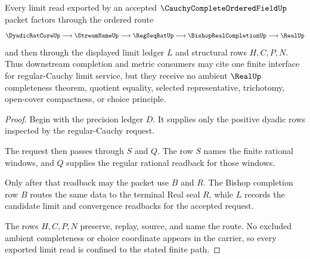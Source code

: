 \begin{theorem}
\label{thm:cauchy-complete-ordered-field-regular-cauchy-limit-route}
Every limit read exported by an accepted $\CauchyCompleteOrderedFieldUp$ packet factors through the ordered route
$$
\DyadicRatCoreUp \longrightarrow \StreamNameUp \longrightarrow \RegSeqRatUp \longrightarrow \BishopRealCompletionUp \longrightarrow \RealUp
$$
and then through the displayed limit ledger $L$ and structural rows $H,C,P,N$. Thus downstream completion and metric consumers may cite one finite interface for regular-Cauchy limit service, but they receive no ambient $\RealUp$ completeness theorem, quotient equality, selected representative, trichotomy, open-cover compactness, or choice principle.
\end{theorem}
\begin{proof}
Begin with the precision ledger $D$. It supplies only the positive dyadic rows inspected by the regular-Cauchy request.

The request then passes through $S$ and $Q$. The row $S$ names the finite rational windows, and $Q$ supplies the regular rational readback for those windows.

Only after that readback may the packet use $B$ and $R$. The Bishop completion row $B$ routes the same data to the terminal Real seal $R$, while $L$ records the candidate limit and convergence readbacks for the accepted request.

The rows $H,C,P,N$ preserve, replay, source, and name the route. No excluded ambient completeness or choice coordinate appears in the carrier, so every exported limit read is confined to the stated finite path.
\end{proof}

